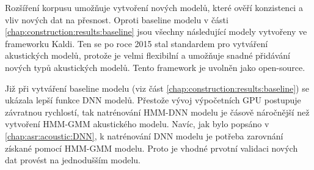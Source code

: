 

Rozšíření korpusu umožňuje vytvoření nových modelů, které ověří konzistenci a vliv nových dat na přesnost. Oproti baseline modelu v části \ref{chap:construction:results:baseline} jsou všechny následující modely vytvořeny ve frameworku Kaldi. Ten se po roce 2015 stal standardem pro vytváření akustických modelů, protože je velmi flexibilní a umožňuje snadné přidávání nových typů akustických modelů. \cite{Kaldi2011} Tento framework je uvolněn jako open-source.



Již při vytváření baseline modelu (viz část \ref{chap:construction:results:baseline}) se ukázala lepší funkce DNN modelů. Přestože vývoj výpočetních GPU postupuje závratnou rychlostí, tak natrénování HMM-DNN modelu je čásově náročnější než vytvoření HMM-GMM akustického modelu. Navíc, jak bylo popsáno v \ref{chap:asr:acoustic:DNN}, k natrénování DNN modelu je potřeba zarovnání získané pomocí HMM-GMM modelu. Proto je vhodné prvotní validaci nových dat provést na jednodušším modelu.


